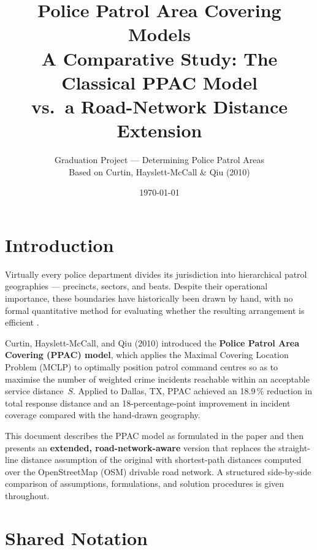 \documentclass[12pt]{article}
\title{\textbf{Police Patrol Area Covering Models}\\[0.4em]
       \large A Comparative Study: The Classical PPAC Model\\
       vs.\ a Road-Network Distance Extension}
\author{Graduation Project --- Determining Police Patrol Areas\\
        Based on Curtin, Hayslett-McCall \& Qiu (2010)}
\date{\today}
\begin{document}
\maketitle
\tableofcontents
\newpage

\section{Introduction}

Virtually every police department divides its jurisdiction into hierarchical
patrol geographies --- precincts, sectors, and beats.  Despite their operational
importance, these boundaries have historically been drawn by hand, with no
formal quantitative method for evaluating whether the resulting arrangement
is efficient \cite{curtin2010}.

Curtin, Hayslett-McCall, and Qiu (2010) introduced the \textbf{Police Patrol
Area Covering (PPAC) model}, which applies the Maximal Covering Location
Problem (MCLP) \cite{church1974} to optimally position patrol command centres
so as to maximise the number of weighted crime incidents reachable within an
acceptable service distance~$S$.  Applied to Dallas, TX, PPAC achieved an
18.9\,\% reduction in total response distance and an 18-percentage-point
improvement in incident coverage compared with the hand-drawn geography.

This document describes the PPAC model as formulated in the paper and then
presents an \textbf{extended, road-network-aware} version that replaces the
straight-line distance assumption of the original with shortest-path distances
computed over the OpenStreetMap (OSM) drivable road network.  A structured
side-by-side comparison of assumptions, formulations, and solution procedures
is given throughout.

\section{Shared Notation}
\end{document}
